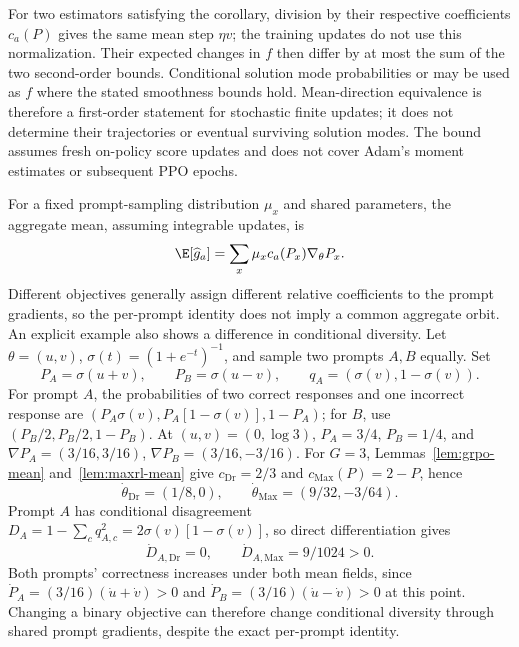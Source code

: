 For two estimators satisfying the corollary, division by their respective
coefficients $c_a(P)$ gives the same mean step $\eta v$; the training updates
do not use this normalization. Their expected changes in $f$ then differ by
at most the sum of the two second-order bounds. Conditional solution mode
probabilities or \pmd{} may be used as $f$ where the stated smoothness bounds
hold. Mean-direction equivalence is
therefore a first-order statement for stochastic finite updates; it does
not determine their trajectories or eventual surviving solution modes.
The bound assumes fresh on-policy score updates and does not cover Adam's
moment estimates or subsequent PPO epochs.

\begin{remark}
\label{rem:neural-binary-shared-prompts}
For a fixed prompt-sampling distribution $\mu_x$ and shared parameters,
the aggregate mean, assuming integrable updates, is
\begin{equation}
 \E[\widehat g_a]
 =\sum_x\mu_x c_a(P_x)\nabla_\theta P_x.
 \label{eq:neural-binary-prompt-sum}
\end{equation}
Different objectives generally assign different relative coefficients to
the prompt gradients, so the per-prompt identity does not imply a common
aggregate orbit. An explicit example also shows a difference in conditional
diversity. Let $\theta=(u,v)$, $\sigma(t)=(1+e^{-t})^{-1}$, and sample two
prompts $A,B$ equally. Set
\[
 P_A=\sigma(u+v),\qquad P_B=\sigma(u-v),\qquad
 q_A=(\sigma(v),1-\sigma(v)).
\]
For prompt $A$, the probabilities of two correct responses and one incorrect
response are $(P_A\sigma(v),P_A[1-\sigma(v)],1-P_A)$; for $B$, use
$(P_B/2,P_B/2,1-P_B)$. At $(u,v)=(0,\log3)$,
$P_A=3/4$, $P_B=1/4$, and
$\nabla P_A=(3/16,3/16)$, $\nabla P_B=(3/16,-3/16)$.
For $G=3$, Lemmas~\ref{lem:grpo-mean} and~\ref{lem:maxrl-mean} give
$c_{\mathrm{Dr}}=2/3$ and $c_{\mathrm{Max}}(P)=2-P$, hence
\[
 \dot\theta_{\mathrm{Dr}}=(1/8,0),\qquad
 \dot\theta_{\mathrm{Max}}=(9/32,-3/64).
\]
Prompt $A$ has conditional disagreement
$D_A=1-\sum_cq_{A,c}^2=2\sigma(v)[1-\sigma(v)]$, so direct
differentiation gives
\[
 \dot D_{A,\mathrm{Dr}}=0,\qquad
 \dot D_{A,\mathrm{Max}}=9/1024>0.
\]
Both prompts' correctness increases under both mean fields, since
$\dot P_A=(3/16)(\dot u+\dot v)>0$ and
$\dot P_B=(3/16)(\dot u-\dot v)>0$ at this point. Changing a binary
objective can therefore change conditional diversity through shared prompt
gradients, despite the exact per-prompt identity.
\end{remark}

